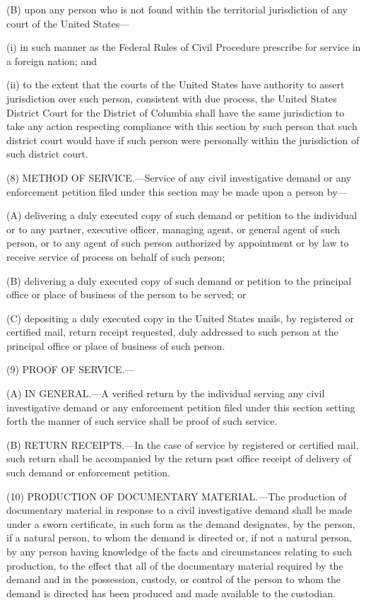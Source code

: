 (B) upon any person who is not found within the territorial jurisdiction of any court of the United States—

(i) in such manner as the Federal Rules of Civil Procedure prescribe for service in a foreign nation; and

(ii) to the extent that the courts of the United States have authority to assert jurisdiction over such person, consistent with due process, the United States District Court for the District of Columbia shall have the same jurisdiction to take any action respecting compliance with this section by such person that such district court would have if such person were personally within the jurisdiction of such district court.

(8) METHOD OF SERVICE.—Service of any civil investigative demand or any enforcement petition filed under this section may be made upon a person by—

(A) delivering a duly executed copy of such demand or petition to the individual or to any partner, executive officer, managing agent, or general agent of such person, or to any agent of such person authorized by appointment or by law to receive service of process on behalf of such person;

(B) delivering a duly executed copy of such demand or petition to the principal office or place of business of the person to be served; or

(C) depositing a duly executed copy in the United States mails, by registered or certified mail, return receipt requested, duly addressed to such person at the principal office or place of business of such person.

(9) PROOF OF SERVICE.—

(A) IN GENERAL.—A verified return by the individual serving any civil investigative demand or any enforcement petition filed under this section setting forth the manner of such service shall be proof of such service.

(B) RETURN RECEIPTS.—In the case of service by registered or certified mail, such return shall be accompanied by the return post office receipt of delivery of such demand or enforcement petition.

(10) PRODUCTION OF DOCUMENTARY MATERIAL.—The production of documentary material in response to a civil investigative demand shall be made under a sworn certificate, in such form as the demand designates, by the person, if a natural person, to whom the demand is directed or, if not a natural person, by any person having knowledge of the facts and circumstances relating to such production, to the effect that all of the documentary material required by the demand and in the possession, custody, or control of the person to whom the demand is directed has been produced and made available to the custodian.

